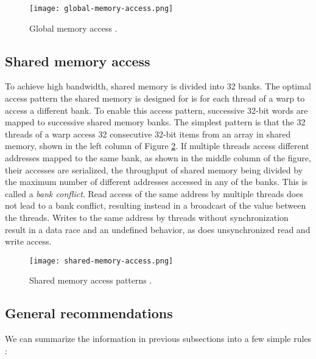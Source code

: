 \begin{figure}[ht]
	\centering
	\texttt{[image: global-memory-access.png]}
	\caption{Global memory access \citep{site:cuda}.}
	\label{fig:global_memory_access}
\end{figure}

\subsection{Shared memory access}
To achieve high bandwidth, shared memory is divided into 32 banks. The optimal access pattern the shared memory is designed for is for each thread of a warp to access a different bank. To enable this access pattern, successive 32-bit words are mapped to successive shared memory banks. The simplest pattern is that the 32 threads of a warp access 32 consecutive 32-bit items from an array in shared memory, shown in the left column of Figure \ref{fig:shared_memory_access}. If multiple threads access different addresses mapped to the same bank, as shown in the middle column of the figure, their accesses are serialized, the throughput of shared memory being divided by the maximum number of different addresses accessed in any of the banks. This is called a \textit{bank conflict}. Read access of the same address by multiple threads does not lead to a bank conflict, resulting instead in a broadcast of the value between the threads. Writes to the same address by threads without synchronization result in a data race and an undefined behavior, as does unsynchronized read and write access.

\begin{figure}[ht]
	\centering
	\texttt{[image: shared-memory-access.png]}
	\caption{Shared memory access patterns \citep{site:cuda}.}
	\label{fig:shared_memory_access}
\end{figure}

\subsection{General recommendations}

We can summarize the information in previous subsections into a few simple rules \citep{site:cuda}:

